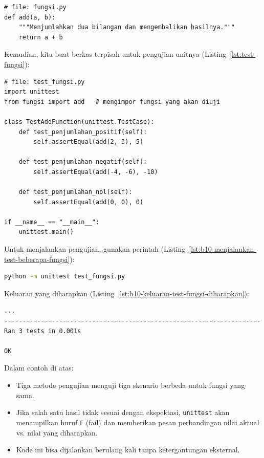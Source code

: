 \begin{lstlisting}[style=PythonStyle, caption={Fungsi yang akan diuji}, label={lst:fungsi-add}]
# file: fungsi.py
def add(a, b):
    """Menjumlahkan dua bilangan dan mengembalikan hasilnya."""
    return a + b
\end{lstlisting}

Kemudian, kita buat berkas terpisah untuk pengujian unitnya (Listing~\ref{lst:test-fungsi}):

\begin{lstlisting}[style=PythonStyle, caption={Contoh pengujian fungsi sederhana}, label={lst:test-fungsi}]
# file: test_fungsi.py
import unittest
from fungsi import add   # mengimpor fungsi yang akan diuji

class TestAddFunction(unittest.TestCase):
    def test_penjumlahan_positif(self):
        self.assertEqual(add(2, 3), 5)

    def test_penjumlahan_negatif(self):
        self.assertEqual(add(-4, -6), -10)

    def test_penjumlahan_nol(self):
        self.assertEqual(add(0, 0), 0)

if __name__ == "__main__":
    unittest.main()
\end{lstlisting}

Untuk menjalankan pengujian, gunakan perintah (Listing~\ref{lst:b10-menjalankan-test-beberapa-fungsi}):

\begin{lstlisting}[language=bash, caption={Menjalankan test untuk beberapa fungsi}, label={lst:b10-menjalankan-test-beberapa-fungsi}]
python -m unittest test_fungsi.py
\end{lstlisting}

Keluaran yang diharapkan (Listing~\ref{lst:b10-keluaran-test-fungsi-diharapkan}):

\begin{lstlisting}[language=bash, caption={Keluaran test fungsi yang diharapkan}, label={lst:b10-keluaran-test-fungsi-diharapkan}]
...
----------------------------------------------------------------------
Ran 3 tests in 0.001s

OK
\end{lstlisting}

Dalam contoh di atas:
\begin{itemize}
    \item Tiga metode pengujian menguji tiga skenario berbeda untuk fungsi yang sama.
    \item Jika salah satu hasil tidak sesuai dengan ekspektasi, \texttt{unittest} akan menampilkan huruf \texttt{F} (fail) dan memberikan pesan perbandingan nilai aktual vs. nilai yang diharapkan.
    \item Kode ini bisa dijalankan berulang kali tanpa ketergantungan eksternal.
\end{itemize}

